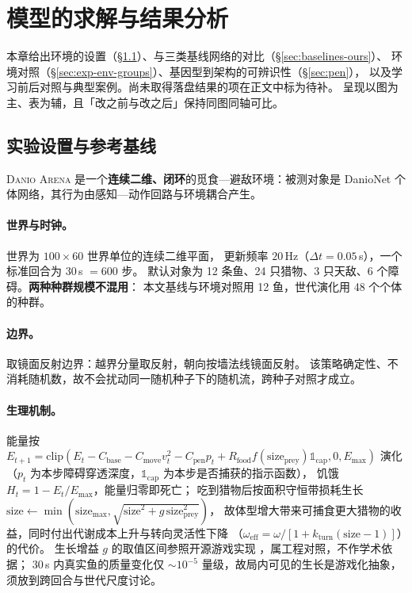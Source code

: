 \section{模型的求解与结果分析}\label{sec:solution}\label{sec:results}\label{sec:experiment}\label{sec:baselines}

本章给出环境的设置（\S\ref{sec:exp-env}）、与三类基线网络的对比（\S\ref{sec:baselines-ours}）、
环境对照（\S\ref{sec:exp-env-groups}）、基因型到架构的可辨识性（\S\ref{sec:pen}），
以及学习前后对照与典型案例。尚未取得落盘结果的项在正文中标为待补。
呈现以图为主、表为辅，且「改之前与改之后」保持同图同轴可比。

\subsection{实验设置与参考基线}\label{sec:exp-env}

\textsc{Danio Arena} 是一个\textbf{连续二维、闭环}的觅食—避敌环境：被测对象是
DanioNet 个体网络，其行为由感知—动作回路与环境耦合产生。

\paragraph{世界与时钟。}世界为 $100\times60$ 世界单位的连续二维平面，
更新频率 $20$\,Hz（$\Delta t=0.05$\,s），一个标准回合为 $30$\,s $=600$ 步。
默认对象为 12 条鱼、24 只猎物、3 只天敌、6 个障碍。\textbf{两种种群规模不混用}：
本文基线与环境对照用 12 鱼，世代演化用 48 个个体的种群。

\paragraph{边界。}取镜面反射边界：越界分量取反射，朝向按墙法线镜面反射。
该策略确定性、不消耗随机数，故不会扰动同一随机种子下的随机流，跨种子对照才成立。

\paragraph{生理机制。}能量按
$E_{t+1}=\mathrm{clip}(E_t-C_{\text{base}}-C_{\text{move}}v_t^2-C_{\text{pen}}p_t
+R_{\text{food}}f(\text{size}_{\text{prey}})\mathbb{1}_{\text{cap}},0,E_{\max})$
演化（$p_t$ 为本步障碍穿透深度，$\mathbb{1}_{\text{cap}}$ 为本步是否捕获的指示函数），
饥饿 $H_t=1-E_t/E_{\max}$，能量归零即死亡；
吃到猎物后按面积守恒带损耗生长
$\text{size}\leftarrow\min(\text{size}_{\max},\sqrt{\text{size}^2+g\,\text{size}_{\text{prey}}^2})$，
故体型增大带来可捕食更大猎物的收益，同时付出代谢成本上升与转向灵活性下降
（$\omega_{\text{eff}}=\omega/[1+k_{\text{turn}}(\text{size}-1)]$）的代价。
生长增益 $g$ 的取值区间参照开源游戏实现 \citep{bib215_testn.d.}，属工程对照，不作学术依据；
$30$\,s 内真实鱼的质量变化仅 $\sim10^{-5}$ 量级，故局内可见的生长是游戏化抽象，须放到跨回合与世代尺度讨论。

